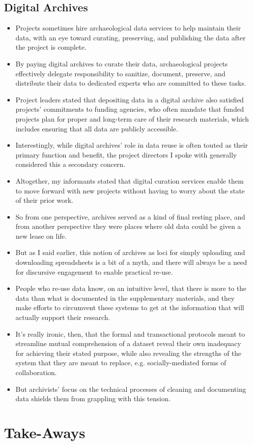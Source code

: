 \documentclass{article}
\begin{document}
\subsection{Digital Archives}
\begin{itemize}
  \item Projects sometimes hire archaeological data services to help maintain their data, with an eye toward curating, preserving, and publishing the data after the project is complete.

  \item By paying digital archives to curate their data, archaeological projects effectively delegate responsibility to sanitize, document, preserve, and distribute their data to dedicated experts who are committed to these tasks.

  \item Project leaders stated that depositing data in a digital archive also satisfied projects’ commitments to funding agencies, who often mandate that funded projects plan for proper and long-term care of their research materials, which includes ensuring that all data are publicly accessible.

  \item Interestingly, while digital archives’ role in data reuse is often touted as their primary function and benefit, the project directors I spoke with generally considered this a secondary concern.

  \item Altogether, my informants stated that digital curation services enable them to move forward with new projects without having to worry about the state of their prior work.

  \item So from one perspective, archives served as a kind of final resting place, and from another perspective they were places where old data could be given a new lease on life.

  \item But as I said earlier, this notion of archives as loci for simply uploading and downloading spreadsheets is a bit of a myth, and there will always be a need for discursive engagement to enable practical re-use.

  \item People who re-use data know, on an intuitive level, that there is more to the data than what is documented in the supplementary materials, and they make efforts to circumvent these systems to get at the information that will actually support their research.

  \item It's really ironic, then, that the formal and transactional protocols meant to streamline mutual comprehension of a dataset reveal their own inadequacy for achieving their stated purpose, while also revealing the strengths of the system that they are meant to replace, e.g. socially-mediated forms of collaboration.

  \item But archivists' focus on the technical processes of cleaning and documenting data shields them from grappling with this tension.
\end{itemize}

\section{Take-Aways}
\end{document}
